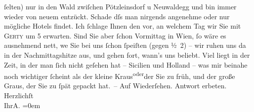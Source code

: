 \begin{ledgroupsized}[t]{13cm}
               ſelten) nur in den Wald zwiſchen Pötzleinsdorf u
                  Neuwaldegg und bin immer wieder von neuem
               entzückt. Schade dſs man nirgends angenehme oder nur mögliche Hotels findet. Ich
               ſchlage Ihnen den \label{K_L01407-1v}\label{K_L01407-1h} vor,
               an welchem Tag wir Sie mit \textsc{Gerty} um 5 erwarten. Sind Sie aber {\pb}ſchon
                  Vormittag in Wien, ſo wäre es
               ausnehmend nett, we{\geminationn}{ }Sie bei uns ſchon ſpeiſten (gegen ½ 2)
               – wir ruhen uns da{\geminationn} in der Nachmittagshitze aus, und
               gehen fort, wann’s uns beliebt. Viel liegt in der Zeit, in der man ſich nicht geſehen
               hat – Sicilien und Holland – was mir beinahe noch wichtiger ſcheint als der
               kleine Kraus\substVorne{}\textsuperscript{oder}\substDazwischen{}der Sie zu früh, und\substHinten{} der große Graus, der Sie zu ſpät gepackt hat. –\pend
           \pstart
           Auf Wiederſehen. Antwort erbeten.{\\[\baselineskip]}Herzlichſt{\\[\baselineskip]}Ihr\spacefill\mbox{A.}\pend
           \leftskip=0em{}
         
         \endnumbering{}\end{ledgroupsized}  \newcommand{\dateiname}{L01407}\newcommand{\titel}{Arthur Schnitzler an Hugo von Hofmannsthal, [19.? 6. 1904]}\newcommand{\editorInnen}{Martin Anton Müller und Gerd-Hermann Susen}
      